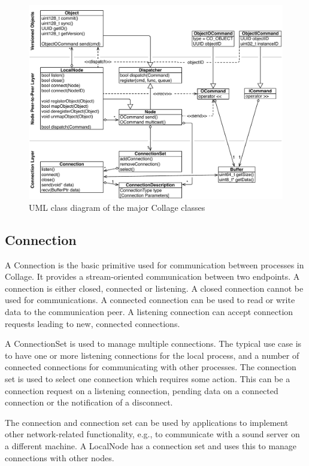 \begin{figure}[h!t]\center
  \includegraphics[width=\textwidth]{images/collageUML}
  {\caption{\label{fCollageUML}UML class diagram of the major Collage classes}}
\end{figure}

\subsection{Connection}

A \textsf{Connection} is the basic primitive used for communication between
processes in Collage. It provides a stream-oriented communication between two
endpoints. A connection is either closed, connected or listening. A closed
connection cannot be used for communications. A connected connection can be
used to read or write data to the communication peer. A listening connection
can accept connection requests leading to new, connected connections.

A \textsf{ConnectionSet} is used to manage multiple connections. The typical use
case is to have one or more listening connections for the local process, and a
number of connected connections for communicating with other processes.
The connection set is used to select one connection which requires some action.
This can be a connection request on a listening connection, pending data on a
connected connection or the notification of a disconnect.

The connection and connection set can be used by applications to implement other
network-related functionality, e.g., to communicate with a sound server on a
different machine. A \textsf{LocalNode} has a connection set and uses this to
manage connections with other nodes.

